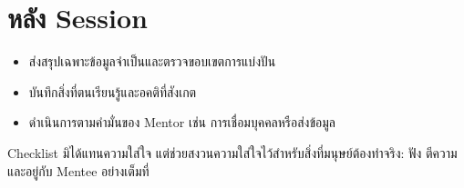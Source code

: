 \section*{หลัง Session}
\begin{itemize}
  \item[$\square$] ส่งสรุปเฉพาะข้อมูลจำเป็นและตรวจขอบเขตการแบ่งปัน
  \item[$\square$] บันทึกสิ่งที่ตนเรียนรู้และอคติที่สังเกต
  \item[$\square$] ดำเนินการตามคำมั่นของ Mentor เช่น การเชื่อมบุคคลหรือส่งข้อมูล
\end{itemize}

\begin{mentornote}
Checklist มิได้แทนความใส่ใจ แต่ช่วยสงวนความใส่ใจไว้สำหรับสิ่งที่มนุษย์ต้องทำจริง: ฟัง ตีความ และอยู่กับ Mentee อย่างเต็มที่
\end{mentornote}
